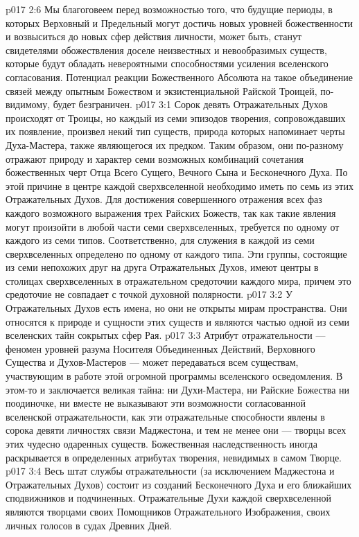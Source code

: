 \vs p017 2:6 Мы благоговеем перед возможностью того, что будущие периоды, в которых Верховный и Предельный могут достичь новых уровней божественности и возвыситься до новых сфер действия личности, может быть, станут свидетелями обожествления доселе неизвестных и невообразимых существ, которые будут обладать невероятными способностями усиления вселенского согласования. Потенциал реакции Божественного Абсолюта на такое объединение связей между опытным Божеством и экзистенциальной Райской Троицей, по\hyp{}видимому, будет безграничен.
\vs p017 3:1 Сорок девять Отражательных Духов происходят от Троицы, но каждый из семи эпизодов творения, сопровождавших их появление, произвел некий тип существ, природа которых напоминает черты Духа\hyp{}Мастера, также являющегося их предком. Таким образом, они по\hyp{}разному отражают природу и характер семи возможных комбинаций сочетания божественных черт Отца Всего Сущего, Вечного Сына и Бесконечного Духа. По этой причине в центре каждой сверхвселенной необходимо иметь по семь из этих Отражательных Духов. Для достижения совершенного отражения всех фаз каждого возможного выражения трех Райских Божеств, так как такие явления могут произойти в любой части семи сверхвселенных, требуется по одному от каждого из семи типов. Соответственно, для служения в каждой из семи сверхвселенных определено по одному от каждого типа. Эти группы, состоящие из семи непохожих друг на друга Отражательных Духов, имеют центры в столицах сверхвселенных в отражательном средоточии каждого мира, причем это средоточие не совпадает с точкой духовной полярности.
\vs p017 3:2 У Отражательных Духов есть имена, но они не открыты мирам пространства. Они относятся к природе и сущности этих существ и являются частью одной из семи вселенских тайн сокрытых сфер Рая.
\vs p017 3:3 Атрибут отражательности --- феномен уровней разума Носителя Объединенных Действий, Верховного Существа и Духов\hyp{}Мастеров --- может передаваться всем существам, участвующим в работе этой огромной программы вселенского осведомления. В этом\hyp{}то и заключается великая тайна: ни Духи\hyp{}Мастера, ни Райские Божества ни поодиночке, ни вместе не выказывают эти возможности согласованной вселенской отражательности, как эти отражательные способности явлены в сорока девяти личностях связи Маджестона, и тем не менее они --- творцы всех этих чудесно одаренных существ. Божественная наследственность иногда раскрывается в определенных атрибутах творения, невидимых в самом Творце.
\vs p017 3:4 Весь штат службы отражательности (за исключением Маджестона и Отражательных Духов) состоит из созданий Бесконечного Духа и его ближайших сподвижников и подчиненных. Отражательные Духи каждой сверхвселенной являются творцами своих Помощников Отражательного Изображения, своих личных голосов в судах Древних Дней.

